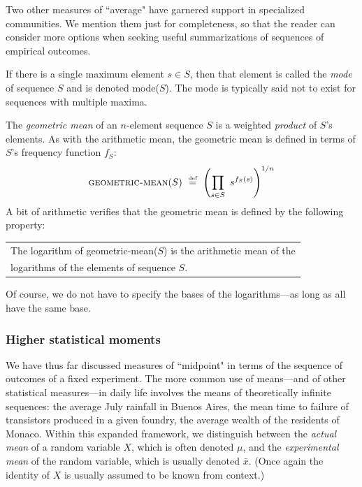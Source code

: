 Two other measures of ``average" have garnered support in specialized communities.  We mention them just for completeness, so that the reader can consider more options when seeking useful summarizations of sequences of empirical outcomes.

\medskip

 

\noindent
If there is a single maximum element $s \in S$, then that element is called the {\em mode} of sequence $S$ and is denoted {\sc mode}($S$).  The mode is typically said not to exist for sequences with multiple maxima.

\medskip

   

\noindent
The {\it geometric mean} of an $n$-element sequence $S$ is a weighted {\em product} of $S$'s elements.  As with the arithmetic mean, the geometric mean is defined in terms of $S$'s frequency function $f_S$:
\[ \mbox{\sc geometric-mean}(S) \ \stackrel{\mbox{{\tiny def}}}{=} \  \left(\prod_{s \in S} \ s^{f_S(s)} \right)^{1/n} \]
A bit of arithmetic verifies that the geometric mean is defined by the following property:

\smallskip

{\em 
\begin{tabular}{l}
The logarithm of {\sc geometric-mean}($S$) is the arithmetic mean of the \\
logarithms of the elements of sequence $S$.
\end{tabular}
}

\smallskip

\noindent
Of course, we do not have to specify the bases of the logarithms---as long as all have the same base.
 
\subsubsection{Higher statistical moments}
\label{sec:mean-plus-moments}


We have thus far discussed measures of ``midpoint" in terms of the sequence of outcomes of a fixed experiment.  The more common use of means---and of other statistical measures---in daily life involves the means of theoretically infinite sequences: the average July rainfall in Buenos Aires, the mean time to failure of transistors produced in a given foundry, the average wealth of the residents of Monaco.  Within this expanded framework, we distinguish between the {\em actual mean} of a random variable $X$, which is often denoted $\mu$, and the {\em experimental mean} of the random variable, which is usually denoted $\bar{x}$.  (Once again the identity of $X$ is usually assumed to be known from context.)

